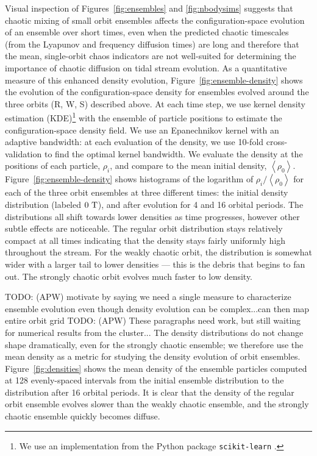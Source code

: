 \documentclass[letterpaper,12pt,preprint]{aastex}
\newcommand{\mean}[1]{\left< #1 \right>}
\newcommand{\periods}{\ensuremath{{\rm T}}}
\newcommand{\todo}[2]{{\color{red} TODO: (\MakeUppercase{#1}) #2}}
\begin{document}
Visual inspection of Figures~\ref{fig:ensembles} and \ref{fig:nbodysims} suggests that chaotic mixing of small orbit ensembles affects the configuration-space evolution of an ensemble over short times, even when the predicted chaotic timescales (from the Lyapunov and frequency diffusion times) are long and therefore that the mean, single-orbit chaos indicators are not well-suited for determining the importance of chaotic diffusion on tidal stream evolution. As a quantitative measure of this enhanced density evolution, Figure~\ref{fig:ensemble-density} shows the evolution of the configuration-space density for ensembles evolved around the three orbits (R, W, S) described above. At each time step, we use kernel density estimation (KDE)\footnote{We use an implementation from the Python package \texttt{scikit-learn} \citep{scikitlearn}.} with the ensemble of particle positions to estimate the configuration-space density field. We use an Epanechnikov kernel with an adaptive bandwidth: at each evaluation of the density, we use 10-fold cross-validation to find the optimal kernel bandwidth. We evaluate the density at the positions of each particle, $\rho_i$, and compare to the mean initial density, $\mean{\rho_0}$. Figure~\ref{fig:ensemble-density} shows histograms of the logarithm of $\rho_i/\mean{\rho_0}$ for each of the three orbit ensembles at three different times: the initial density distribution (labeled $0~\periods$), and after evolution for 4 and 16 orbital periods. The distributions all shift towards lower densities as time progresses, however other subtle effects are noticeable. The regular orbit distribution stays relatively compact at all times indicating that the density stays fairly uniformly high throughout the stream. For the weakly chaotic orbit, the distribution is somewhat wider with a larger tail to lower densities --- this is the debris that begins to fan out. The strongly chaotic orbit evolves much faster to low density. 

\todo{apw}{motivate by saying we need a single measure to characterize ensemble evolution even though density evolution can be complex...can then map entire orbit grid}
\todo{apw}{These paragraphs need work, but still waiting for numerical results from the cluster...}
The density distributions do not change shape dramatically, even for the strongly chaotic ensemble; we therefore use the mean density as a metric for studying the density evolution of orbit ensembles. Figure~\ref{fig:densities} shows the mean density of the ensemble particles computed at 128 evenly-spaced intervals from the initial ensemble distribution to the distribution after 16 orbital periods. It is clear that the density of the regular orbit ensemble evolves slower than the weakly chaotic ensemble, and the strongly chaotic ensemble quickly becomes diffuse.
\end{document}
